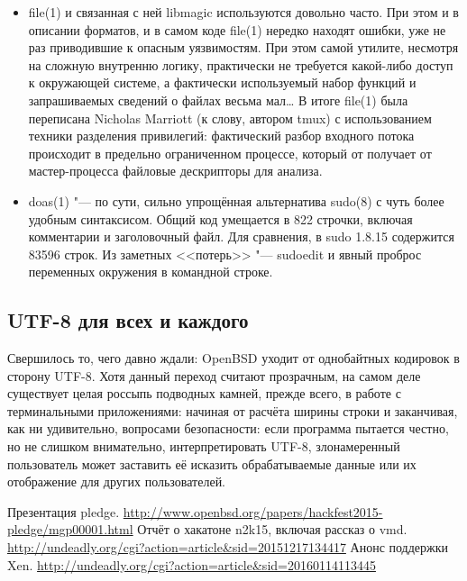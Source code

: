 \documentclass[10pt, a5paper]{article}
\begin{document}
\begin{itemize}
  \item file(1) и связанная с ней libmagic используются довольно часто. При этом и в описании форматов, и в самом коде file(1) нередко находят ошибки, уже не раз приводившие к опасным уязвимостям. При этом самой утилите, несмотря на сложную внутренню логику, практически не требуется какой-либо доступ к окружающей системе, а фактически используемый набор функций и запрашиваемых сведений о файлах весьма мал\ldots{} В итоге file(1) была переписана Nicholas Marriott (к слову, автором tmux) с использованием техники разделения привилегий: фактический разбор входного потока происходит в предельно ограниченном процессе, который от получает от мастер-процесса файловые дескрипторы для анализа.

  \item doas(1) "--- по сути, сильно упрощённая альтернатива sudo(8) с чуть более удобным синтаксисом. Общий код умещается в 822 строчки, включая комментарии и заголовочный файл. Для сравнения, в sudo 1.8.15 содержится 83596 строк. Из заметных <<потерь>> "--- sudoedit и явный проброс переменных окружения в командной строке.
\end{itemize}

\subsection*{UTF-8 для всех и каждого}

Свершилось то, чего давно ждали: OpenBSD уходит от однобайтных кодировок в сторону UTF-8. Хотя данный переход считают прозрачным, на самом деле существует целая россыпь подводных камней, прежде всего, в работе с терминальными приложениями: начиная от расчёта ширины строки и заканчивая, как ни удивительно, вопросами безопасности: если программа пытается честно, но не слишком внимательно, интерпретировать UTF-8, злонамеренный пользователь может заставить её исказить обрабатываемые данные или их отображение для других пользователей.

\begin{thebibliography}{99}
   Презентация pledge. \url{http://www.openbsd.org/papers/hackfest2015-pledge/mgp00001.html}{}
   Отчёт о хакатоне n2k15, включая рассказ о vmd. \url{http://undeadly.org/cgi?action=article&sid=20151217134417}{}
   Анонс поддержки Xen. \url{http://undeadly.org/cgi?action=article&sid=20160114113445}{}
\end{thebibliography}
\end{document}
